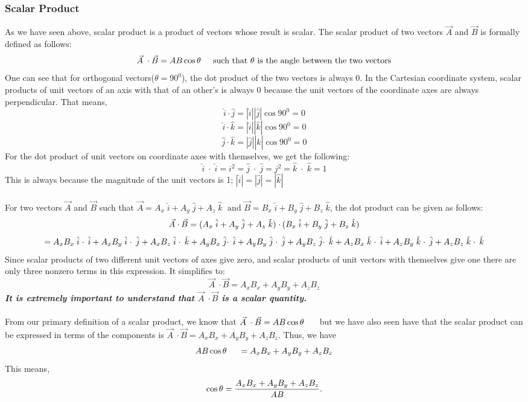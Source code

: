 \documentclass[9pt]{article}
\begin{document}
\subsubsection*{Scalar Product}
As we have seen above, scalar product is a product of vectors whose result is scalar. The scalar product of two vectors $\vec{A}$ and $\vec{B}$ is formally defined as follows:
$$\vec{A}\; \cdot \vec{B} = AB \cos \theta\hspace{0.2in}\text{such that }\theta\text{ is the angle between the two vectors}$$
One can see that for orthogonal vectors($\theta=90^0$), the dot product of the two vectors is always 0. In the Cartesian coordinate system, scalar products of unit vectors of an axis with that of an other's is always 0 because the unit vectors of the coordinate axes are always perpendicular. That means,
$$\hat{i}\cdot\hat{j}=|\hat{i}||\hat{j}|\cos90^0=0$$
$$\hat{i}\cdot\hat{k}=|\hat{i}||\hat{k}|\cos90^0=0$$
$$\hat{j}\cdot\hat{k}=|\hat{j}||\hat{k}|\cos90^0=0$$
For the dot product of unit vectors on coordinate axes with themselves, we get the following:
$$\hat{i}\; \cdotp\; \hat{i} = i^{2} = \hat{j}\; \cdotp\; \hat{j} = j^{2} = \hat{k}\; \cdotp\; \hat{k} = 1 $$
This is always because the magnitude of the unit vectors is 1; $|\hat{i}| = |\hat{j}| = |\hat{k}|$ \\ \\
For two vectors $\vec{A}$ and $\vec{B}$ such that $\vec{A} = A_{x}\; \hat{i} + A_{y}\; \hat{j} + A_{z}\; \hat{k}\; \text{ and } \vec{B} = B_{x}\; \hat{i} + B_{y}\; \hat{j} + B_{z}\; \hat{k}$, the dot product can be given as follows:
$$\vec{A}\; \cdotp \vec{B} = (A_{x}\; \hat{i} + A_{y}\; \hat{j} + A_{z}\; \hat{k})\; \cdotp (B_{x}\; \hat{i} + B_{y}\; \hat{j} + B_{z}\; \hat{k}) \\ $$
$$= A_{x}B_{x}\; \hat{i}\; \cdotp\; \hat{i} + A_{x}B_{y}\; \hat{i}\; \cdotp\; \hat{j} + A_{x}B_{z}\; \hat{i}\; \cdotp\; \hat{k} \\ + A_{y}B_{x}\; \hat{j} \cdotp\; \hat{i} + A_{y}B_{y}\; \hat{j}\; \cdotp\; \hat{j} + A_{y}B_{z}\; \hat{j} \cdotp\; \hat{k} \\ + A_{z}B_{x}\; \hat{k}\; \cdotp\; \hat{i} + A_{z}B_{y}\; \hat{k}\; \cdotp\; \hat{j} + A_{z}B_{z}\; \hat{k}\; \cdotp\; \hat{k}$$
Since scalar products of two different unit vectors of axes give zero, and scalar products of unit vectors with themselves give one there are only three nonzero terms in this expression. It simplifies to:
$$\vec{A}\; \cdotp \vec{B} = A_{x}B_{x} + A_{y}B_{y} + A_{z}B_{z}$$
\textbf{\textit{It is extremely important to understand that $\vec{A}\; \cdotp \vec{B}$ is a scalar quantity.}} \\ \\
From our primary definition of a scalar product, we know that $\vec{A}\; \cdot \vec{B} = AB \cos \theta\hspace{0.2in}$ but we have also seen have that the scalar product can be expressed in terms of the components is $\vec{A}\; \cdotp \vec{B} = A_{x}B_{x} + A_{y}B_{y} + A_{z}B_{z}$. Thus, we have 
$$ AB \cos \theta\hspace{0.2in} = A_{x}B_{x} + A_{y}B_{y} + A_{z}B_{z}$$
This means, 
$$\cos \theta  = \dfrac{A_{x}B_{x} + A_{y}B_{y} + A_{z}B_{z}}{AB} \ldotp \label{2.34}$$
\end{document}
